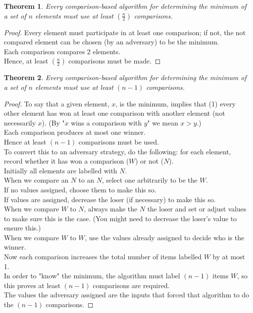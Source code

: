 \documentclass[12pt]{article}
\theoremstyle{plain}
\newtheorem{theorem}{Theorem}[subsection]
\theoremstyle{definition}
\begin{document}
\begin{theorem}
Every comparison-based algorithm for determining the minimum of a set of $n$ elements must use at least $(\frac{n}{2})$ comparisons.
\end{theorem}
\begin{proof}
Every element must participate in at least one comparison;
if not, the not compared element can be chosen (by an adversary) to be the minimum. \\
Each comparison compares 2 elements. \\
Hence, at least $(\frac{n}{2})$ comparisons must be made.
\end{proof}

\begin{theorem}
Every comparison-based algorithm for determining the minimum of a set of $n$ elements must use at least $(n - 1)$ comparisons.
\end{theorem}
\begin{proof}
To say that a given element, $x$, is the minimum, implies that (1) every other element has won at least one comparison with another element (not necessarily $x$). (By "$x$ wins a comparison with $y$" we mean $x > y$.) \\
Each comparison produces at most one winner. \\
Hence at least $(n - 1)$ comparisons must be used. \\

To convert this to an adversary strategy, do the following: for each element, record whether it has won a comparison ($W$) or not ($N$). \\
Initially all elements are labelled with $N$. \\
When we compare an $N$ to an $N$, select one arbitrarily to be the $W$. \\
If no values assigned, choose them to make this so. \\
If values are assigned, decrease the loser (if necessary) to make this so. \\
When we compare $W$ to $N$, always make the $N$ the loser and set or adjust values to make sure this is the case. (You might need to decrease the loser's value to ensure this.) \\
When we compare $W$ to $W$, use the values already assigned to decide who is the winner. \\

Now each comparison increases the total number of items labelled $W$ by at most 1. \\
In order to "know" the minimum, the algorithm must label $(n - 1)$ items $W$, so this proves at least $(n - 1)$ comparisons are required. \\
The values the adversary assigned are the inputs that forced that algorithm to do the $(n - 1)$ comparisons.
\end{proof}
\end{document}

